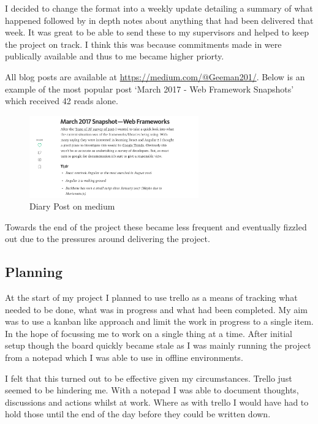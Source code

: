 I decided to change the format into a weekly update
detailing a summary of what happened followed by in depth notes about
anything that had been delivered that week. It was great to be able to send
these to my supervisors and helped to keep the project on track. I
think this was because commitments
made in were publically available and thus to me became higher priorty.

All blog posts are available at \url{https://medium.com/@Geeman201/}. Below
is an example of the most popular post `March 2017 - Web Framework Snapshots'
which received 42 reads alone.

\begin{figure}[H]
\centering
\includegraphics[width=0.65\textwidth]{figures/medium_example}
\captionsetup{justification=centering}
\caption{Diary Post on medium
\label{fig:medium_example}}
\end{figure}

Towards the end of the project these became less frequent and eventually
fizzled out due to the pressures around delivering the project.



\subsection{Planning}
At the start of my project I planned to use trello as a means of tracking what
needed to be done, what was in progress and what had been completed. My aim was
to use a kanban like approach and limit the work in progress to a single item.
In the hope of focussing me to work on a single thing at a time. After
initial setup though the board quickly became stale as I was mainly running
the project from a notepad which I was able to use in offline environments.

I felt that this turned out to be effective given my circumstances. Trello
just seemed to be hindering me. With a notepad I was able to
document thoughts, discussions and actions whilst at work. Where as with
trello I would have had to hold those until the end of the day before they
could be written down.

